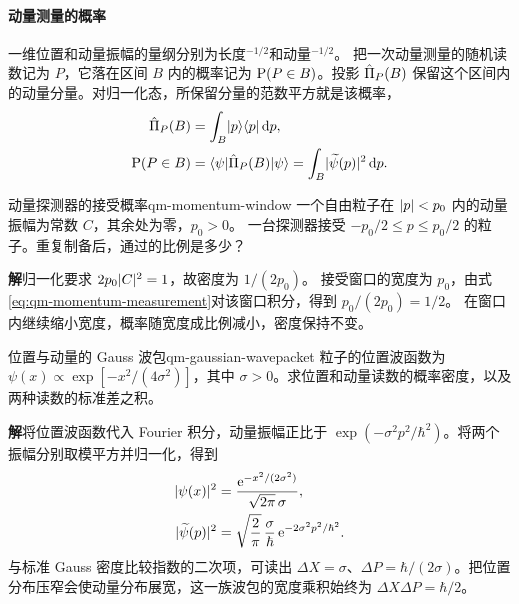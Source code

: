 \paragraph{动量测量的概率}
一维位置和动量振幅的量纲分别为长度$^{-1/2}$和动量$^{-1/2}$。
把一次动量测量的随机读数记为 $P$，它落在区间 $B$ 内的概率记为 $\P(P \in B)$。投影 $\op\Pi_P(B)$ 保留这个区间内的动量分量。对归一化态，所保留分量的范数平方就是该概率，
\begin{subequations}\label{eq:qm-momentum-measurement}
    \begin{align}
        \op\Pi_P(B) &= \int_B\ketbra{p}{p}\d p,\\
        \P(P \in B) &= \mel{\psi}{\op\Pi_P(B)}{\psi} = \int_B\abs{\widetilde\psi(p)}^2\d p .
    \end{align}
\end{subequations}

\begin{example}{动量探测器的接受概率}{qm-momentum-window}
    一个自由粒子在 $\abs{p} < p_0$ 内的动量振幅为常数 $C$，其余处为零，$p_0 > 0$。
    一台探测器接受 $-p_0/2 \leq p \leq p_0/2$ 的粒子。重复制备后，通过的比例是多少？

    \par\smallskip\textbf{解}\quad 归一化要求 $2p_0\abs{C}^2 = 1$，故密度为 $1/(2p_0)$。
    接受窗口的宽度为 $p_0$，由式\eqref{eq:qm-momentum-measurement}对该窗口积分，得到 $p_0/(2p_0) = 1/2$。
    在窗口内继续缩小宽度，概率随宽度成比例减小，密度保持不变。
\end{example}

\begin{example}{位置与动量的 Gauss 波包}{qm-gaussian-wavepacket}
    粒子的位置波函数为 $\psi(x) \propto \exp[-x^2/(4\sigma^2)]$，其中 $\sigma > 0$。求位置和动量读数的概率密度，以及两种读数的标准差之积。

    \par\smallskip\textbf{解}\quad 将位置波函数代入 Fourier 积分，动量振幅正比于 $\exp(-\sigma^2p^2/\hbar^2)$。将两个振幅分别取模平方并归一化，得到
    \begin{subequations}\label{eq:qm-gaussian-conjugate-densities}
        \begin{align}
            \abs{\psi(x)}^2 &= \frac{\e^{-x^2/(2\sigma^2)}}{\sqrt{2\pi}\,\sigma},\\
            \abs{\widetilde\psi(p)}^2 &= \sqrt{\frac{2}{\pi}}\,\frac{\sigma}{\hbar} \e^{-2\sigma^2p^2/\hbar^2}.
        \end{align}
    \end{subequations}
    与标准 Gauss 密度比较指数的二次项，可读出 $\Delta X = \sigma$、$\Delta P = \hbar/(2\sigma)$。把位置分布压窄会使动量分布展宽，这一族波包的宽度乘积始终为 $\Delta X\Delta P = \hbar/2$。
\end{example}

